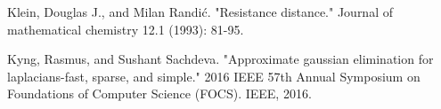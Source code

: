 \documentclass[11pt]{article}
\begin{document}
\begin{thebibliography}{9}
Klein, Douglas J., and Milan Randić. "Resistance distance." Journal of mathematical chemistry 12.1 (1993): 81-95.

Kyng, Rasmus, and Sushant Sachdeva. "Approximate gaussian elimination for laplacians-fast, sparse, and simple." 2016 IEEE 57th Annual Symposium on Foundations of Computer Science (FOCS). IEEE, 2016.


\end{thebibliography}
\end{document}
